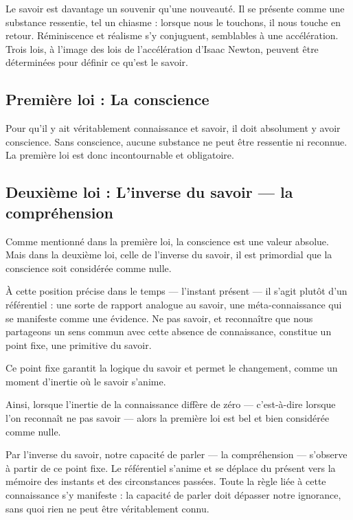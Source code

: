 \documentclass[12pt,oneside]{article}
\begin{document}
Le savoir est davantage un souvenir qu'une nouveauté. Il se présente comme une substance ressentie, tel un chiasme : lorsque nous le touchons, il nous touche en retour. Réminiscence et réalisme s'y conjuguent, semblables à une accélération. Trois lois, à l'image des lois de l'accélération d'Isaac Newton, peuvent être déterminées pour définir ce qu'est le savoir.

\subsection{Première loi : La conscience}

Pour qu'il y ait véritablement connaissance et savoir, il doit absolument y avoir conscience. Sans conscience, aucune substance ne peut être ressentie ni reconnue. La première loi est donc incontournable et obligatoire.

\subsection{Deuxième loi : L'inverse du savoir --- la compréhension}

Comme mentionné dans la première loi, la conscience est une valeur absolue. Mais dans la deuxième loi, celle de l'inverse du savoir, il est primordial que la conscience soit considérée comme nulle.

À cette position précise dans le temps --- l'instant présent --- il s'agit plutôt d'un référentiel : une sorte de rapport analogue au savoir, une méta-connaissance qui se manifeste comme une évidence. Ne pas savoir, et reconnaître que nous partageons un sens commun avec cette absence de connaissance, constitue un point fixe, une primitive du savoir.

Ce point fixe garantit la logique du savoir et permet le changement, comme un moment d'inertie où le savoir s'anime.

Ainsi, lorsque l'inertie de la connaissance diffère de zéro --- c'est-à-dire lorsque l'on reconnaît ne pas savoir --- alors la première loi est bel et bien considérée comme nulle.

Par l'inverse du savoir, notre capacité de parler --- la compréhension --- s'observe à partir de ce point fixe. Le référentiel s'anime et se déplace du présent vers la mémoire des instants et des circonstances passées. Toute la règle liée à cette connaissance s'y manifeste : la capacité de parler doit dépasser notre ignorance, sans quoi rien ne peut être véritablement connu.
\end{document}
